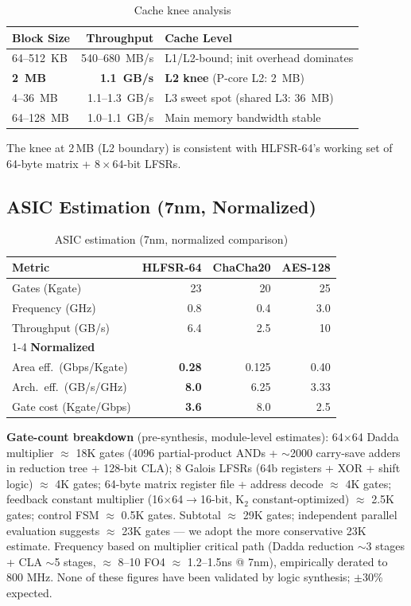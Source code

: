 \documentclass[11pt,a4paper]{article}
\begin{document}
\begin{table}[H]
\centering
\begin{tabular}{@{}lrl@{}}
\toprule
\textbf{Block Size} & \textbf{Throughput} & \textbf{Cache Level} \\
\midrule
64--512~KB & 540--680~MB/s & L1/L2-bound; init overhead dominates \\
\textbf{2~MB} & \textbf{1.1~GB/s} & \textbf{L2 knee} (P-core L2: 2~MB) \\
4--36~MB    & 1.1--1.3~GB/s & L3 sweet spot (shared L3: 36~MB) \\
64--128~MB  & 1.0--1.1~GB/s & Main memory bandwidth stable \\
\bottomrule
\end{tabular}
\caption{Cache knee analysis}
\label{tab:cache}
\end{table}

The knee at 2\,MB (L2 boundary) is consistent with HLFSR-64's working set of
64-byte matrix + $8{\times}$64-bit LFSRs.

\subsection{ASIC Estimation (7nm, Normalized)}

\begin{table}[H]
\centering
\begin{tabular}{@{}lrrr@{}}
\toprule
\textbf{Metric} & \textbf{HLFSR-64} & \textbf{ChaCha20} & \textbf{AES-128} \\
\midrule
Gates (Kgate)          & 23 & 20 & 25 \\
Frequency (GHz)        & 0.8 & 0.4 & 3.0 \\
Throughput (GB/s)      & 6.4 & 2.5 & 10 \\
\cmidrule(lr){1-4}
\textbf{Normalized} \\
\quad Area eff.\ (Gbps/Kgate) & \textbf{0.28} & 0.125 & 0.40 \\
\quad Arch.\ eff.\ (GB/s/GHz) & \textbf{8.0} & 6.25 & 3.33 \\
\quad Gate cost (Kgate/Gbps)  & \textbf{3.6} & 8.0 & 2.5 \\
\bottomrule
\end{tabular}
\caption{ASIC estimation (7nm, normalized comparison)}
\label{tab:asic}
\end{table}

\textbf{Gate-count breakdown} (pre-synthesis, module-level estimates):
64$\times$64 Dadda multiplier $\approx$ 18K gates (4096 partial-product ANDs
+ $\sim$2000 carry-save adders in reduction tree + 128-bit CLA); 8 Galois
LFSRs (64b registers + XOR + shift logic) $\approx$ 4K gates; 64-byte
matrix register file + address decode $\approx$ 4K gates; feedback constant
multiplier (16$\times$64$\to$16-bit, K$_2$ constant-optimized) $\approx$
2.5K gates; control FSM $\approx$ 0.5K gates. Subtotal $\approx$ 29K gates;
independent parallel evaluation suggests $\approx$ 23K gates --- we adopt
the more conservative 23K estimate. Frequency based on multiplier critical
path (Dadda reduction $\sim$3 stages + CLA $\sim$5 stages, $\approx$ 8--10
FO4 $\approx$ 1.2--1.5ns @ 7nm), empirically derated to 800 MHz. None of
these figures have been validated by logic synthesis; $\pm$30\% expected.
\end{document}
